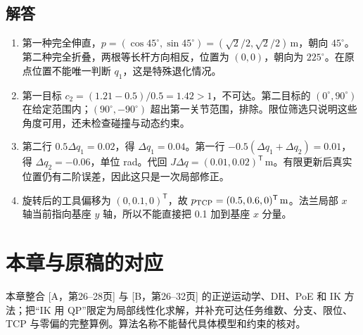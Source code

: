 \subsection*{解答}
\begin{enumerate}
\item 第一种完全伸直，$p=(\cos45^\circ,\sin45^\circ)=(\sqrt2/2,\sqrt2/2)\,\mathrm m$，朝向 $45^\circ$。第二种完全折叠，两根等长杆方向相反，位置为 $(0,0)$，朝向为 $225^\circ$。在原点位置不能唯一判断 $q_1$，这是特殊退化情况。
\item 第一目标 $c_2=(1.21-0.5)/0.5=1.42>1$，不可达。第二目标的 $(0^\circ,90^\circ)$ 在给定范围内；$(90^\circ,-90^\circ)$ 超出第一关节范围，排除。限位筛选只说明这些角度可用，还未检查碰撞与动态约束。
\item 第二行 $0.5\Delta q_1=0.02$，得 $\Delta q_1=0.04$。第一行 $-0.5(\Delta q_1+\Delta q_2)=0.01$，得 $\Delta q_2=-0.06$，单位 rad。代回 $J\Delta q=(0.01,0.02)^\mathsf T\,\mathrm m$。有限更新后真实位置仍有二阶误差，因此这只是一次局部修正。
\item 旋转后的工具偏移为 $(0,0.1,0)^\mathsf T$，故 $p_{\rm TCP}=(0.5,0.6,0)^\mathsf T\,\mathrm m$。法兰局部 $x$ 轴当前指向基座 $y$ 轴，所以不能直接把 0.1 加到基座 $x$ 分量。
\end{enumerate}

\section*{本章与原稿的对应}
本章整合 [A，第26--28页] 与 [B，第26--32页] 的正逆运动学、DH、PoE 和 IK 方法；把“IK 用 QP”限定为局部线性化求解，并补充可达任务维数、分支、限位、TCP 与零偏的完整算例。算法名称不能替代具体模型和约束的核对。
